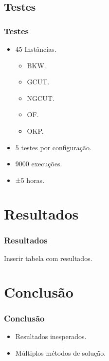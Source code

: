 \documentclass[12pt]{beamer}
\begin{document}
    \subsection{Testes}\label{subsec:testes}
    \begin{frame}
        \frametitle{Testes}
        \begin{itemize}
            \item 45 Instâncias.
            \begin{itemize}
                \item BKW.
                \item GCUT.
                \item NGCUT.
                \item OF.
                \item OKP.
            \end{itemize}
            \item 5 testes por configuração.
            \item 9000 execuções.
            \item ±5 horas.
        \end{itemize}
    \end{frame}


    \section{Resultados}\label{sec:resultados}
    \begin{frame}
        \frametitle{Resultados}
        Inserir tabela com resultados.
    \end{frame}


    \section{Conclusão}\label{sec:conclusao}
    \begin{frame}
        \frametitle{Conclusão}
        \begin{itemize}
            \item Resultados inesperados.
            \item Múltiplos métodos de solução.
        \end{itemize}
    \end{frame}
\end{document}
